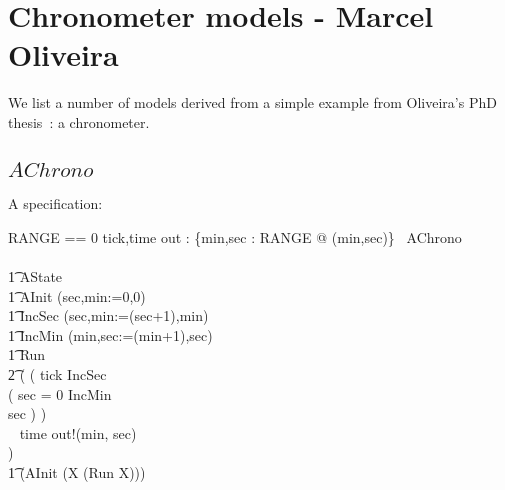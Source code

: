 \section{Chronometer models - Marcel Oliveira~\cite{MV05}}

We list a number of models derived from a simple example from
Oliveira's PhD thesis~\cite{MV05}: a chronometer.

\subsection{$AChrono$}

A specification:
\begin{circus}
RANGE == 0 
\also \circchannel tick,time
\also \circchannel out : \{min,sec : RANGE @ (min,sec)\}
\also
\circprocess\ AChrono \circdef\\
\circbegin\\
\t1 \circstate AState \\
\t1 AInit \circdef (sec,min:=0,0)\\
\t1 IncSec \circdef (sec,min:=(sec+1),min)\\
\t1 IncMin \circdef (min,sec:=(min+1),sec)\\
\t1 Run \circdef \\
\t2 (
(
  tick \then IncSec \circseq \\
      (
        \circif sec = 0 \circthen IncMin\\
        \circelse sec  \circthen \Skip \circfi
      )
)\\
    \extchoice~ time \then out!(min, sec) \then \Skip \\
)\\
\t1 \circspot (AInit \circseq (\circmu X \circspot (Run \circseq X)))\\
\circend
\end{circus}

